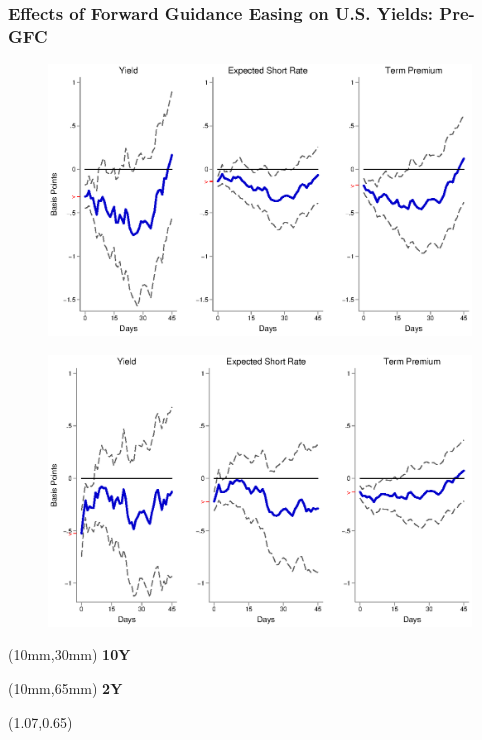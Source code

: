 \documentclass[12pt, aspectratio=169, xcolor=dvipsnames]{beamer}
\begin{document}
\begin{frame}[label=FGUSpre]
\frametitle{Effects of Forward Guidance Easing on U.S. Yields: Pre-GFC}
\begin{figure}[!htbp]
	\begin{center} %
		\includegraphics[trim={0cm 0cm 0cm 0cm},clip,height=0.45\textheight,width=0.85\linewidth]{../Figures/LPs/LagDep-FX/Path/US/DCMP/PathUSDnomyptp120mPre.eps}
		\par\end{center}
\end{figure}
\vspace{-0.5cm}
\begin{figure}[!htbp]
	\begin{center} %
		\includegraphics[trim={0cm 0cm 0cm 0.76cm},clip,height=0.45\textheight,width=0.85\linewidth]{../Figures/LPs/LagDep-FX/Path/US/DCMP/PathUSDnomyptp24mPre.eps}
		\par\end{center}
\end{figure}
\begin{textblock*}{8mm}(10mm,30mm)
	\small \textbf{10Y}
\end{textblock*}
\begin{textblock*}{8mm}(10mm,65mm)
	\small \textbf{2Y}
\end{textblock*}
\begin{textblock*}{5cm}(1.07\textwidth,0.65\textheight)
	\hyperlink{FGEMpre}{}
\end{textblock*}
\end{frame}
\end{document}
